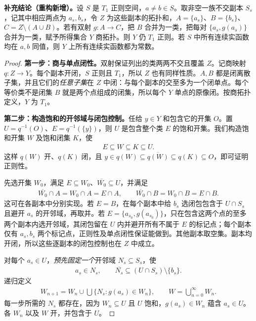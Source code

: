 \documentclass[../../main.tex]{subfiles}
\begin{document}
\begin{proposition}[把两点约束传播到整个空间]\label{proposition:ch04-twin-quotient-regular}
\textbf{补充结论（重构新增）。}设 $S$ 是 $T_1$ 正则空间，$a\ne b\in S$。取非空一族不交副本 $S_s$，记其中相应两点为 $a_s,b_s$，令 $Z$ 为这些副本的拓扑和，$A=\{a_s\}$、$B=\{b_s\}$、$C=Z\setminus(A\cup B)$。若有双射 $g:A\to C$，把 $B$ 合并为一类，把每对 $\{a_s,g(a_s)\}$ 合并为一类，赋予所得集合 $Y$ 商拓扑。则 $Y$ 仍 $T_1$ 正则。若 $S$ 中所有连续实函数均在 $a,b$ 同值，则 $Y$ 上所有连续实函数都为常数。
\end{proposition}
\begin{proof}
\textbf{第一步：商与单点闭性。}双射保证列出的类两两不交且覆盖 $Z$。记商映射 $q:Z\to Y$。每个副本开闭，$S$ 正则且 $T_1$，所以 $Z$ 也有同样性质。$A,B$ 都是闭离散子集，并且它们的\emph{任意子集}在 $Z$ 中闭：与每个副本的交至多为一个闭单点。每个等价类不是闭集 $B$ 就是两个点组成的闭集，所以每个 $Y$ 单点的原像闭。按商拓扑定义，$Y$ 为 $T_1$。

\textbf{第二步：构造饱和的开邻域与闭包控制。}任给 $y\in Y$ 和包含它的开集 $O$。置 $U=q^{-1}(O)$、$E=q^{-1}(\{y\})$，则 $U$ 是包含整个类 $E$ 的饱和开集。我们构造饱和开集 $W$ 及饱和闭集 $K$，使
\begin{align*}
E\subseteq W\subseteq K\subseteq U.
\end{align*}
这样 $q(W)$ 开、$q(K)$ 闭，且 $y\in q(W)\subseteq\overline{q(W)}\subseteq q(K)\subseteq O$，即可证明正则性。

先选开集 $W_0$，满足 $E\subseteq W_0$、$\overline{W_0}\subseteq U$，并满足
\begin{align*}
\overline{W_0}\cap A=W_0\cap A=E\cap A,
\qquad
\overline{W_0}\cap B=W_0\cap B=E\cap B.
\end{align*}
这可在各副本中分别实现。若 $E=B$，在每个副本中给 $b_s$ 选闭包包含于 $U\cap S_s$ 且避开 $a_s$ 的开邻域，再取并。若 $E=\{a_{s_0},g(a_{s_0})\}$，只在包含这两个点的至多两个副本内选开邻域，其闭包留在 $U$ 内并避开所有不属于 $E$ 的标记点；每个副本仅有 $a_s,b_s$ 两个标记点，正则性及单点闭性保证能做到。其他副本取空集。副本均开闭，所以这些逐副本的闭包控制也在 $Z$ 中成立。

对每个 $a_s\in U$，\emph{预先固定一个}开邻域 $N_s\subseteq S_s$，使
\begin{align*}
a_s\in N_s,\qquad\overline{N_s}\subseteq (U\cap S_s)\setminus\{b_s\}.
\end{align*}
递归定义
\begin{align*}
W_{n+1}=W_n\cup\bigcup\{N_s:g(a_s)\in W_n\},
\qquad W=\bigcup_{n=0}^{\infty}W_n.
\end{align*}
每一步所需的 $N_s$ 都存在，因为 $W_n\subseteq U$ 且 $U$ 饱和，$g(a_s)\in W_n$ 蕴含 $a_s\in U$。各 $W_n$ 以及 $W$ 开，并包含于 $U$。


\end{proof}
\end{document}
